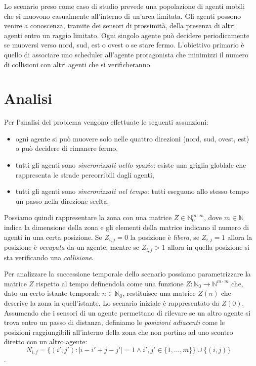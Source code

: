 


Lo scenario preso come caso di studio prevede una popolazione di agenti mobili che si muovono casualmente all'interno di un'area limitata. Gli agenti possono venire a conoscenza, tramite dei sensori di prossimità, della presenza di altri agenti entro un raggio limitato.
Ogni singolo agente può decidere periodicamente se muoversi verso nord, sud, est o ovest o se stare fermo.
L’obiettivo primario è quello di associare uno scheduler all'agente protagonista che minimizzi il numero di collisioni con altri agenti che si verificheranno.

\section{Analisi}
Per l’analisi del problema vengono effettuate le seguenti assunzioni:
\begin{itemize}
	\item ogni agente si può muovere solo nelle quattro direzioni (nord, sud, ovest, est) o può decidere di rimanere fermo,
	\item tutti gli agenti sono \emph{sincronizzati nello spazio}: esiste una griglia globlale che rappresenta le strade percorribili dagli agenti,
	\item tutti gli agenti sono \emph{sincronizzati nel tempo}: tutti eseguono allo stesso tempo un passo nella direzione scelta.
\end{itemize}

Possiamo quindi rappresentare la zona con una matrice $Z \in \mathbb{N}_0^{m\cdot m}$, dove $m \in \mathbb{N}$ indica la dimensione della zona e gli elementi della matrice indicano il numero di agenti in una certa posizione. Se $Z_{i,j}=0$ la posizione è \emph{libera}, se $Z_{i,j}=1$  allora la posizione è \emph{occupata} da un agente, mentre se $Z_{i,j}>1$ allora in quella posizione si sta verificando una \emph{collisione}.

Per analizzare la successione temporale dello scenario possiamo parametrizzare la matrice $Z$ rispetto al tempo definendola come una funzione $Z:\mathbb{N}_0 \rightarrow \mathbb{N}^{m\cdot m}$ che, dato un certo istante temporale $n \in \mathbb{N}_0$, restituisce una matrice $Z(n)$ che descrive la zona in quell’istante. Lo scenario iniziale è rappresentato da $Z(0)$.
Assumendo che i sensori di un agente permettano di rilevare se un altro agente si trova entro un passo di distanza, definiamo le \emph{posizioni adiacenti} come le posizioni raggiungibili all’interno della zona che non portino ad uno scontro diretto con un altro agente:
$$ N_{i,j} = \{(i',j') : |i-i'+j-j'| = 1 \wedge i',j' \in \{1,\dots,m\}\} \cup \{(i,j)\} $$.

